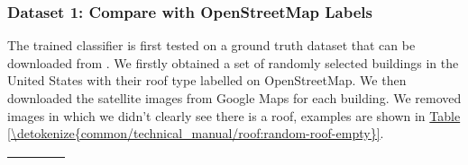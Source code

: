 \documentclass[letterpaper,10pt,english]{sphinxmanual}
\begin{document}
\subsubsection{Dataset 1: Compare with OpenStreetMap Labels}
\label{\detokenize{common/technical_manual/roof:dataset-1-compare-with-openstreetmap-labels}}
\sphinxAtStartPar
The trained classifier is first tested on a ground truth dataset that can be downloaded from .
We firstly obtained a set of randomly selected buildings in the United States with their roof type labelled on OpenStreetMap.
We then downloaded the satellite images from Google Maps for each building.
We removed images in which we didn’t clearly see there is a roof, examples are shown in \hyperref[\detokenize{common/technical_manual/roof:random-roof-empty}]{Table \ref{\detokenize{common/technical_manual/roof:random-roof-empty}}}.


\begin{savenotes}\sphinxattablestart
\centering
{}
\sphinxthecaptionisattop
{}\label{\detokenize{common/technical_manual/roof:id3}}\label{\detokenize{common/technical_manual/roof:random-roof-empty}}
\sphinxaftertopcaption
\begin{tabulary}{\linewidth}[t]{|T|T|T|T|}
\hline
\begin{sphinxfigure-in-table}
\centering

\noindent{}
\end{sphinxfigure-in-table}\relax
&\begin{sphinxfigure-in-table}
\centering

\noindent{}
\end{sphinxfigure-in-table}\relax
&\begin{sphinxfigure-in-table}
\centering

\noindent{}
\end{sphinxfigure-in-table}\relax
&\begin{sphinxfigure-in-table}
\centering

\noindent{}
\end{sphinxfigure-in-table}\relax
\\
\hline
\end{tabulary}
\par
\sphinxattableend\end{savenotes}
\end{document}
